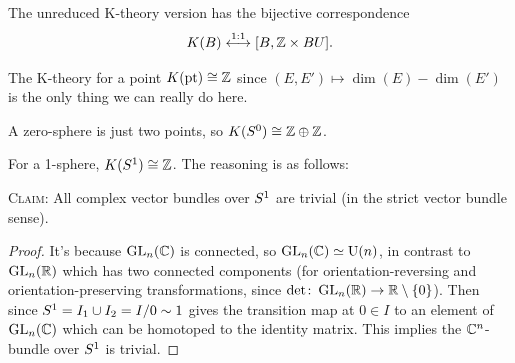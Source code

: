 \begin{remark}
The unreduced K-theory version has the bijective correspondence
\begin{equation*}
K(B)\stackrel{1:1}{\longleftrightarrow}[B,\ZZ\times BU].
\end{equation*}
\end{remark}

\begin{example}
The K-theory for a point $K(\point{*})\iso\ZZ$ since
$(E,E')\mapsto\dim(E)-\dim(E')$ is the only thing we can really do here.
\end{example}

\begin{example}
A zero-sphere is just two points, so $K(\sphere{0})\iso\ZZ\oplus\ZZ$.
\end{example}

\begin{example}
For a 1-sphere, $K(\sphere{1})\iso\ZZ$. The reasoning is as follows:

\textsc{Claim:} All complex vector bundles over $\sphere{1}$ are
trivial (in the strict vector bundle sense).

\begin{proof}
It's because $\GL_{n}(\CC)$ is connected, so $\GL_{n}(\CC)\homotopic\U(n)$,
in contrast to $\GL_{n}(\RR)$ which has two connected components (for
orientation-reversing and orientation-preserving transformations,
since $\det\colon\GL_{n}(\RR)\to\RR\setminus\{0\}$). Then since
$\sphere{1}=I_{1}\cup I_{2}=I/0\sim 1$ gives the transition map at
$0\in I$ to an element of $\GL_{n}(\CC)$ which can be homotoped to the
identity matrix. This implies the $\CC^{n}$-bundle over $\sphere{1}$
is trivial.
\end{proof}
\end{example}

